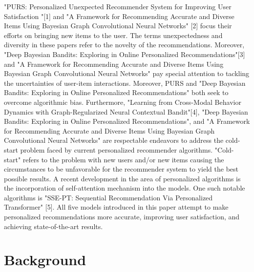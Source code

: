 "PURS: Personalized Unexpected Recommender System for Improving User Satisfaction "[1] and "A Framework for Recommending Accurate and Diverse Items Using Bayesian Graph Convolutional Neural Networks" [2] focus their efforts on bringing new items to the user. The terms unexpectedness and diversity in these papers refer to the novelty of the recommendations. Moreover, "Deep Bayesian Bandits: Exploring in Online Personalized Recommendations"[3] and  "A Framework for Recommending Accurate and Diverse Items Using Bayesian Graph Convolutional Neural Networks" pay special attention to tackling the uncertainties of user-item interactions. Moreover,
PURS and "Deep Bayesian Bandits: Exploring in Online Personalized Recommendations" both seek to overcome algorithmic bias. Furthermore, "Learning from Cross-Modal Behavior Dynamics with Graph-Regularized Neural Contextual Bandit"[4], "Deep Bayesian Bandits: Exploring in Online Personalized Recommendations", and "A Framework for Recommending Accurate and Diverse Items Using Bayesian Graph Convolutional Neural Networks" are respectable endeavors to address the cold-start problem faced by current personalized recommender algorithms.  "Cold-start" refers to the problem with new users and/or new items causing the circumstances to be unfavorable for the recommender system to yield the best possible results.  A recent development in the area of personalized algorithms is the incorporation of self-attention mechanism into the models. One such notable algorithms is "SSE-PT:
Sequential Recommendation Via Personalized Transformer" [5]. All five models introduced in this paper attempt to make personalized recommendations more accurate, improving user satisfaction, and achieving state-of-the-art results. 
\chapter{Background}

